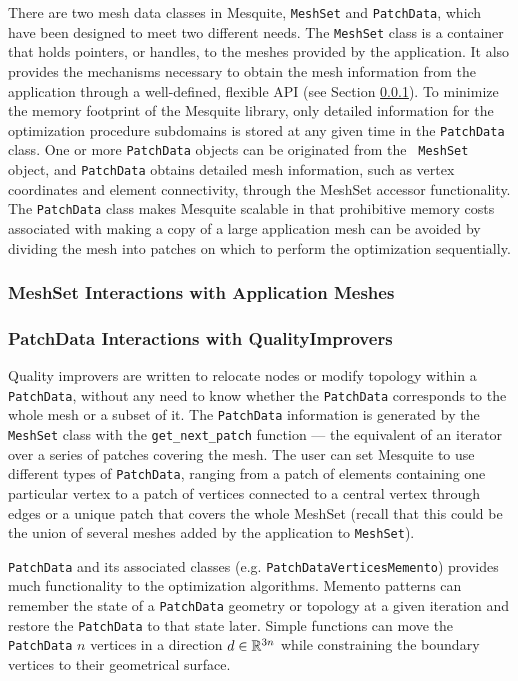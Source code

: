 \documentclass[psfig]{article}
\begin{document}
There are two mesh data classes in Mesquite, \texttt{MeshSet} and
\texttt{PatchData}, which have been designed to meet two different
needs.  The {\tt MeshSet} class is a container that holds pointers, or
handles, to the meshes provided by the application.  It also provides
the mechanisms necessary to obtain the mesh information from the
application through a well-defined, flexible API (see Section
\ref{sec:meshset}).  To minimize the memory footprint of the Mesquite
library, only detailed information for the optimization procedure
subdomains is stored at any given time in the {\tt PatchData} class.
One or more {\tt PatchData} objects can be originated from the {\tt
MeshSet} object, and {\tt PatchData} obtains detailed mesh
information, such as vertex coordinates and element connectivity,
through the MeshSet accessor functionality.  The \texttt{PatchData}
class makes Mesquite scalable in that prohibitive memory costs
associated with making a copy of a large application mesh can be
avoided by dividing the mesh into patches on which to perform the
optimization sequentially.

\subsubsection{MeshSet Interactions with Application Meshes}
\label{sec:meshset}

\subsubsection{PatchData Interactions with QualityImprovers}

Quality improvers are written to relocate nodes or modify topology
within a \texttt{PatchData}, without any need to know whether the
\texttt{PatchData} corresponds to the whole mesh or a subset of
it. The \texttt{PatchData} information is generated by the
\texttt{MeshSet} class with the \texttt{get\_next\_patch} function ---
the equivalent of an iterator over a series of patches covering the
mesh.  The user can set Mesquite to use different types of
\texttt{PatchData}, ranging from a patch of elements containing one
particular vertex to a patch of vertices connected to a central vertex
through edges or a unique patch that covers the whole MeshSet
(recall that this could be the union of several meshes added by the
application to \texttt{MeshSet}).

\texttt{PatchData} and its associated classes
(e.g. \texttt{PatchDataVerticesMemento}) provides much functionality
to the optimization algorithms.  Memento patterns can remember the
state of a \texttt{PatchData} geometry or topology at a given
iteration and restore the \texttt{PatchData} to that state
later. Simple functions can move the \texttt{PatchData} $n$ vertices
in a direction $d \in \Bbb{R}^{3n}$ while constraining the boundary
vertices to their geometrical surface.
\end{document}
